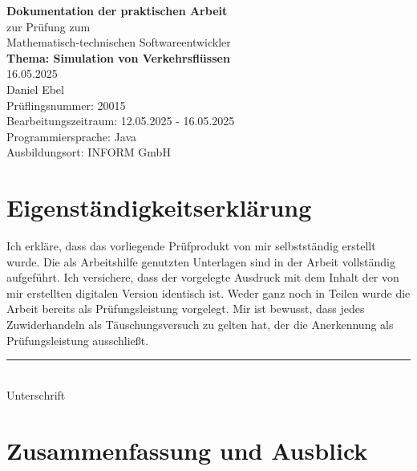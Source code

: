 \documentclass[a4paper,12pt]{report}
\begin{document}
\begin{titlepage}
    \centering
    \vspace*{3cm}
    {\Huge \textbf{Dokumentation der praktischen Arbeit}}\\[2cm]
    {\large zur Prüfung zum \\ Mathematisch-technischen Softwareentwickler}\\[2cm]
    {\Large \textbf{Thema: Simulation von Verkehrsflüssen}}\\[1cm]
    {16.05.2025}\\[5cm]
    {Daniel Ebel}\\[2cm]
    Prüflingsnummer: 20015\\[0.5cm]
    Bearbeitungszeitraum: 12.05.2025 - 16.05.2025\\[0.5cm]
    Programmiersprache: Java\\[0.5cm]
    Ausbildungsort: INFORM GmbH
\end{titlepage}

\chapter*{Eigenständigkeitserklärung}
Ich erkläre, dass das vorliegende Prüfprodukt von mir selbstständig erstellt wurde.
Die als Arbeitshilfe genutzten Unterlagen sind in der Arbeit vollständig aufgeführt.
Ich versichere, dass der vorgelegte Ausdruck mit dem Inhalt der von mir erstellten digitalen Version identisch ist.
Weder ganz noch in Teilen wurde die Arbeit bereits als Prüfungsleistung vorgelegt.
Mir ist bewusst, dass jedes Zuwiderhandeln als Täuschungsversuch zu gelten hat, der die Anerkennung als Prüfungsleistung ausschließt.

\vspace{2cm}

\noindent\rule{7cm}{0.4pt}\\
Unterschrift

\tableofcontents










\chapter{Zusammenfassung und Ausblick}

\appendix
\end{document}
